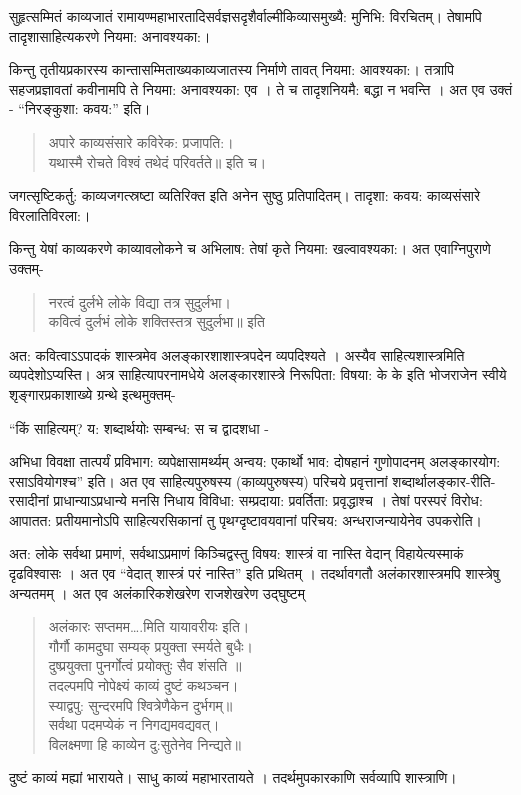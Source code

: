 {सुहृत्सम्मितं काव्यजातं रामायण्महाभारतादिसर्वज्ञसदृशैर्वाल्मीकिव्यासमुख्यै: मुनिभि: विरचितम्। तेषामपि तादृशासाहित्यकरणे नियमा: अनावश्यका:।

किन्तु तृतीयप्रकारस्य कान्तासम्मिताख्यकाव्यजातस्य निर्माणे तावत् नियमा: आवश्यका:। तत्रापि सहजप्रज्ञावतां कवीनामपि ते नियमा: अनावश्यका: एव । ते च तादृशनियमै: बद्धा न भवन्ति ।  अत एव उक्तं - “निरङ्कुशा: कवय:” इति।
\begin{verse}
अपारे काव्यसंसारे कविरेक: प्रजापति:।\\
यथास्मै रोचते विश्वं तथेदं परिवर्तते॥ इति च।
\end{verse}
जगत्सृष्टिकर्तु: काव्यजगत्स्रष्टा व्यतिरिक्त इति अनेन सुष्ठु प्रतिपादितम्। तादृशा: कवय: काव्यसंसारे विरलातिविरला:।

किन्तु येषां काव्यकरणे काव्यावलोकने च अभिलाष: तेषां कृते नियमा: खल्वावश्यका:। अत एवाग्निपुराणे उक्तम्-
\begin{verse}
नरत्वं दुर्लभे लोके विद्या तत्र सुदुर्लभा।\\
कवित्वं दुर्लभं लोके शक्तिस्तत्र सुदुर्लभा॥ इति
\end{verse}
अत: कवित्वाऽऽपादकं शास्त्रमेव अलङ्कारशाशास्त्रपदेन व्यपदिश्यते । अस्यैव साहित्यशास्त्रमिति व्यपदेशोऽप्यस्ति। अत्र साहित्यापरनामधेये अलङ्कारशास्त्रे निरूपिता: विषया: के के इति भोजराजेन स्वीये शृङ्गारप्रकाशाख्ये ग्रन्थे इत्थमुक्तम्-

“किं साहित्यम्? य: शब्दार्थयोः सम्बन्ध: स च द्वादशधा -

अभिधा विवक्षा तात्पर्यं प्रविभाग: व्यपेक्षासामर्थ्यम् अन्वय: एकार्थो भाव: दोषहानं गुणोपादनम् अलङ्कारयोग: रसाऽवियोगश्च” इति। अत एव साहित्यपुरुषस्य (काव्यपुरुषस्य) परिचये प्रवृत्तानां शब्दार्थालङ्कार-रीति-रसादीनां प्राधान्याऽप्रधान्ये मनसि निधाय विविधा: सम्प्रदाया: प्रवर्तिता: प्रवृद्धाश्च । तेषां परस्परं विरोध: आपातत: प्रतीयमानोऽपि साहित्यरसिकानां तु पृथग्दृष्टावयवानां  परिचय: अन्धराजन्यायेनेव उपकरोति।

अत: लोके सर्वथा प्रमाणं, सर्वथाऽप्रमाणं किञ्चिद्वस्तु विषय: शास्त्रं वा नास्ति वेदान् विहायेत्यस्माकं दृढविश्वासः । अत एव “वेदात् शास्त्रं परं नास्ति” इति प्रथितम् । तदर्थावगतौ अलंकारशास्त्रमपि शास्त्रेषु अन्यतमम् । अत एव अलंकारिकशेखरेण राजशेखरेण उद्घुष्टम् 
\begin{verse}
अलंकारः सप्तमम….मिति यायावरीयः इति।\\
गौर्गौ कामदुघा सम्यक् प्रयुक्ता स्मर्यते बुधैः।\\
दुष्प्रयुक्ता पुनर्गोत्वं प्रयोक्तुः सैव शंसति ॥\\
तदल्पमपि नोपेक्ष्यं काव्यं दुष्टं कथञ्चन।\\
स्याद्वपु: सुन्दरमपि श्वित्रेणैकेन दुर्भगम्॥\\
सर्वथा पदमप्येकं न निगद्यमवद्यवत्।\\
विलक्ष्मणा हि काव्येन दु:सुतेनेव निन्द्यते॥
\end{verse}
दुष्टं काव्यं मह्यां भारायते। साधु काव्यं महाभारतायते । तदर्थमुपकारकाणि सर्वव्यापि शास्त्राणि।

}
